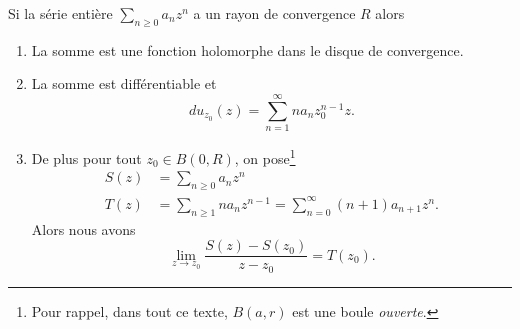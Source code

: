 \begin{proposition}     \label{PropSNMEooVgNqBP} 
    Si la série entière \( \sum_{n\geq 0}a_nz^n\) a un rayon de convergence \( R\) alors
    \begin{enumerate}
        \item
            La somme est une fonction holomorphe dans le disque de convergence.
        \item       \label{ItemUULDooEGRNiA}
            La somme est différentiable et
            \begin{equation}
                du_{z_0}(z)=\sum_{n=1}^{\infty}na_nz_0^{n-1}z.
            \end{equation}
        \item
    De plus pour tout \( z_0\in B(0,R)\), on pose\footnote{Pour rappel, dans tout ce texte, \( B(a,r)\) est une boule \emph{ouverte}.}
    \begin{subequations}
        \begin{align}
            S(z)&=\sum_{n\geq 0}a_nz^n\\
            T(z)&=\sum_{n\geq 1}na_nz^{n-1}=\sum_{n=0}^{\infty}(n+1)a_{n+1}z^n.
        \end{align}
    \end{subequations}
    Alors  nous avons
    \begin{equation}    \label{EqVQDPooOPICwN}
        \lim_{z\to z_0}\frac{ S(z)-S(z_0) }{ z-z_0 }=T(z_0).
    \end{equation}
    \end{enumerate}
\end{proposition}

